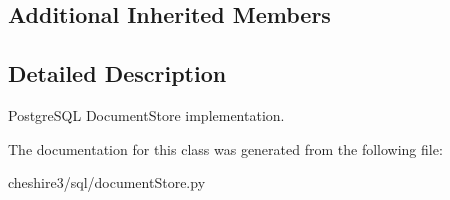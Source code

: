 \subsection*{Additional Inherited Members}


\subsection{Detailed Description}
\begin{DoxyVerb}PostgreSQL DocumentStore implementation.\end{DoxyVerb}
 

The documentation for this class was generated from the following file\-:\begin{DoxyCompactItemize}
\item 
cheshire3/sql/document\-Store.\-py\end{DoxyCompactItemize}
